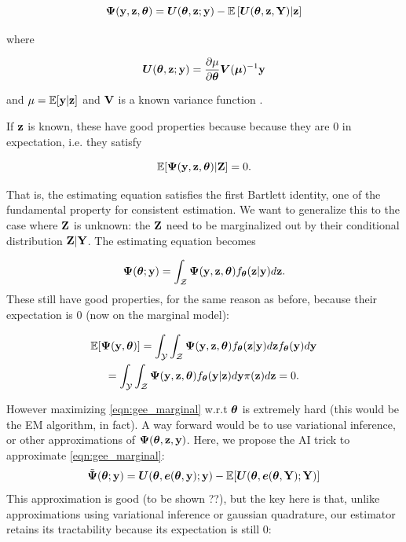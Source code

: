 \documentclass[twoside,11pt]{article}
\newcommand{\E}{{\mathbb{E}}}
\begin{document}
\begin{equation}
\bm\Psi(\y, \z, \bt) = \bm U(\bt, \z; \y) - \E\left[\bm U (\bt, \z, \Y)|\z\right]
\end{equation}

where

\begin{equation}
\bm U({\bm{\theta}}, {\bf z};{\bf y}) = \frac{\partial\mu}{\partial{\bm{\theta}}}\bm V(\bm\mu)^{-1} {\bf y}
\end{equation}

and $\mu = \E[\y|\z]$ and ${\bf V}$ is a known variance function . 


If ${\bf z}$ is known, these have good properties because because they are 0 in expectation, i.e. they satisfy

$$
\E[\bm\Psi(\y, \z, \bt)|\Z] = 0.
$$

That is, the estimating equation satisfies the first Bartlett identity, one of the fundamental property for consistent estimation. We want to generalize this to the case where ${\bf Z}$ is unknown: the ${\bf Z}$ need to be marginalized out by their conditional distribution ${\bf Z}|{\bf Y}$. The estimating equation becomes

\begin{equation}
\bm \Psi({\bm{\theta}};{\bf y}) = \int_{\mathcal Z}\bm\Psi({\bf y}, {\bf z}, {\bm{\theta}})f_{\bm{\theta}}({\bf z}|{\bf y})d{\bf z}.
\label{eqn:gee_marginal}
\end{equation}
These still have good properties, for the same reason as before, because their expectation is 0 (now on the marginal model):

\begin{multline}
\E[\bm\Psi(\y, \bt)] = \int_{\mathcal Y}\int_{\mathcal Z}\bm\Psi(\y, \z, \bt)f_\bt(\z|\y)d\z f_\bt(\y)d\y 
\\= \int_{\mathcal Y}\int_{\mathcal Z}\bm\Psi(\y, \z, \bt)f_\bt(\y|\z)d\y \pi(\z) d\z = 0.
\end{multline}

However maximizing \eqref{eqn:gee_marginal} w.r.t ${\bm{\theta}}$ is extremely hard (this would be the EM algorithm, in fact). A way forward would be to use variational inference, or other approximations of $\bm\Psi({\bm{\theta}}, {\bf z}, {\bf y})$. Here, we propose the AI trick to approximate \eqref{eqn:gee_marginal}:
%
\begin{equation}
    \tilde{\bm\Psi}(\bt;\y) = \bm U(\bt, \e(\bt, \y); \y) - \E[\bm U(\bt, \e(\bt, \Y); \Y)]
\end{equation}
%
This approximation is good (to be shown ??), but the key here is that, unlike approximations using variational inference or gaussian quadrature, our estimator retains its tractability because its expectation is still 0:
\end{document}
